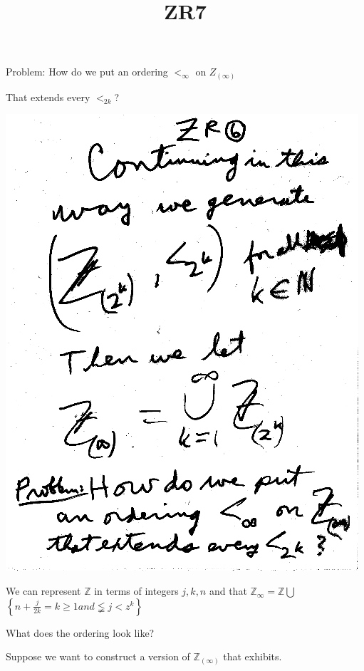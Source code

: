 \documentclass[10pt,a4paper]{article}
\begin{document}
{{Problem: How do we put an ordering $<_{\infty}$ on $Z_{(\infty)}$ 

That extends every $<_{2k}$?

\quad
\includegraphics[scale=0.6]{Pages/ZR6.png}

\newpage 
\title{ZR7}
\maketitle

We can represent $\mathbb{Z}$ in terms of integers $j,k,n$ and that $\mathbb{Z} _{\infty} = \mathbb{Z}\bigcup$ $\left\{n+\frac{j}{2k} = k\geqslant1 and \lneqq j < z^k\right\}$

What does the ordering look like? 

Suppose we want to construct a version of $\mathbb{Z}_{(\infty)}$ that exhibits.  

}}
\end{document}
